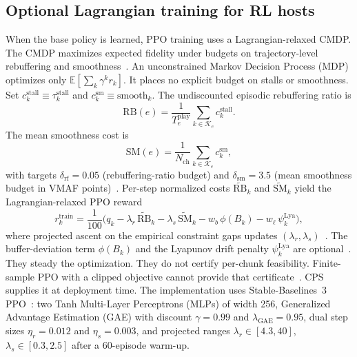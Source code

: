\subsection{Optional Lagrangian training for RL hosts}
\label{sec:system:cmdp}

When the base policy is learned, PPO training uses a Lagrangian-relaxed CMDP.
The CMDP maximizes expected fidelity under budgets on trajectory-level rebuffering and smoothness~\cite{altman1999constrained,paternain2019dual,achiam2017constrained}.
An unconstrained Markov Decision Process (MDP) optimizes only \(\mathbb{E}[\sum_k \gamma^k r_k]\). It places no explicit budget on stalls or smoothness.
Set \(c^{\mathrm{stall}}_k \equiv \tau^{\mathrm{stall}}_k\) and \(c^{\mathrm{sm}}_k \equiv \text{smooth}_k\).
The undiscounted episodic rebuffering ratio is
\begin{equation}
    \mathrm{RB}(e)=\frac{1}{T^{\mathrm{play}}_{e}}\sum_{k\in\mathcal{K}_{e}} c^{\mathrm{stall}}_k.
\end{equation}
The mean smoothness cost is
\begin{equation}
    \mathrm{SM}(e)=\frac{1}{N_{\mathrm{ch}}}\sum_{k\in\mathcal{K}_{e}} c^{\mathrm{sm}}_k,
\end{equation}
with targets \(\delta_{\mathrm{rf}}{=}0.05\) (rebuffering-ratio budget) and \(\delta_{\mathrm{sm}}{=}3.5\) (mean smoothness budget in VMAF points)~\cite{yin2015control}.
Per-step normalized costs \(\widetilde{\mathrm{RB}}_k\) and \(\widetilde{\mathrm{SM}}_k\) yield the Lagrangian-relaxed PPO reward
\begin{equation}
\label{eq:rtrain-app}
    r^{\mathrm{train}}_k
    = \frac{1}{100}\Big(
        q_k
        - \lambda_r \,\widetilde{\mathrm{RB}}_k
        - \lambda_s \,\widetilde{\mathrm{SM}}_k
        - w_b\,\phi(B_k)
        - w_\ell\,\psi^{\mathrm{Lya}}_k
    \Big),
\end{equation}
where projected ascent on the empirical constraint gaps updates \((\lambda_r,\lambda_s)\)~\cite{paternain2019dual}.
The buffer-deviation term \(\phi(B_k)\) and the Lyapunov drift penalty \(\psi^{\mathrm{Lya}}_k\) are optional~\cite{neely2010stochastic}.
They steady the optimization. They do not certify per-chunk feasibility.
Finite-sample PPO with a clipped objective cannot provide that certificate~\cite{schulman2017proximal}.
CPS supplies it at deployment time.
The implementation uses Stable-Baselines~3 PPO~\cite{raffin2021sb3,schulman2017proximal}: two Tanh Multi-Layer Perceptrons (MLPs) of width 256, Generalized Advantage Estimation (GAE) with discount \(\gamma{=}0.99\) and \(\lambda_{\mathrm{GAE}}{=}0.95\), dual step sizes \(\eta_r{=}0.012\) and \(\eta_s{=}0.003\), and projected ranges \(\lambda_r\in[4.3,40]\), \(\lambda_s\in[0.3,2.5]\) after a 60-episode warm-up.
